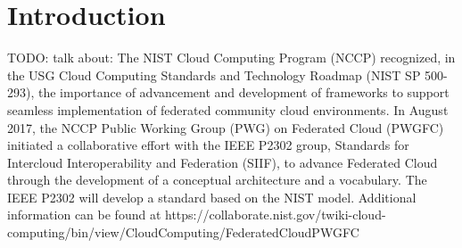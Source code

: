 
\section{Introduction}
\label{sec:intro}

TODO: talk about:
The NIST Cloud Computing Program (NCCP) recognized, in the USG Cloud Computing Standards and Technology Roadmap (NIST SP 500-293), the importance of advancement and development of frameworks to support seamless implementation of federated community cloud environments. In August 2017, the NCCP Public Working Group (PWG) on Federated Cloud (PWGFC) initiated a collaborative effort with the IEEE P2302 group, Standards for Intercloud Interoperability and Federation (SIIF), to advance Federated Cloud through the development of a conceptual architecture and a vocabulary. The IEEE P2302 will develop a standard based on the NIST model.  Additional information can be found at https://collaborate.nist.gov/twiki-cloud-computing/bin/view/CloudComputing/FederatedCloudPWGFC  

